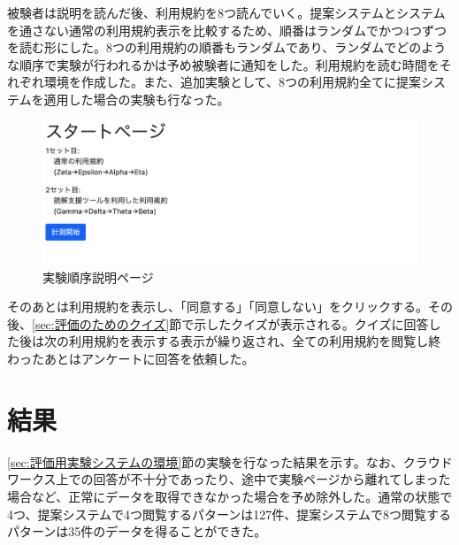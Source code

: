 被験者は説明を読んだ後、利用規約を8つ読んでいく。提案システムとシステムを通さない通常の利用規約表示を比較するため、順番はランダムでかつ4つずつを読む形にした。8つの利用規約の順番もランダムであり、ランダムでどのような順序で実験が行われるかは予め被験者に通知をした。利用規約を読む時間をそれぞれ環境を作成した。また、追加実験として、8つの利用規約全てに提案システムを適用した場合の実験も行なった。
\begin{figure}[h]
  \begin{center}
      \includegraphics[width=16cm]{img/teststart2.png}
      \caption{実験順序説明ページ}
      \label{img:実験順序説明ページ}
  \end{center}
\end{figure}

そのあとは利用規約を表示し、「同意する」「同意しない」をクリックする。その後、\ref{sec:評価のためのクイズ}節で示したクイズが表示される。クイズに回答した後は次の利用規約を表示する表示が繰り返され、全ての利用規約を閲覧し終わったあとはアンケートに回答を依頼した。

\section{結果}
\ref{sec:評価用実験システムの環境}節の実験を行なった結果を示す。なお、クラウドワークス上での回答が不十分であったり、途中で実験ページから離れてしまった場合など、正常にデータを取得できなかった場合を予め除外した。通常の状態で4つ、提案システムで4つ閲覧するパターンは127件、提案システムで8つ閲覧するパターンは35件のデータを得ることができた。

